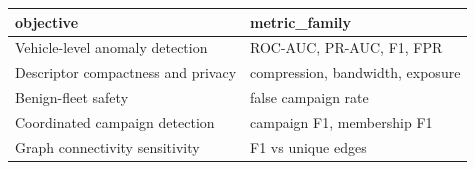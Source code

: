 \begin{tabular}{ll}
\toprule
objective & metric_family \\
\midrule
Vehicle-level anomaly detection & ROC-AUC, PR-AUC, F1, FPR \\
Descriptor compactness and privacy & compression, bandwidth, exposure \\
Benign-fleet safety & false campaign rate \\
Coordinated campaign detection & campaign F1, membership F1 \\
Graph connectivity sensitivity & F1 vs unique edges \\
\bottomrule
\end{tabular}
